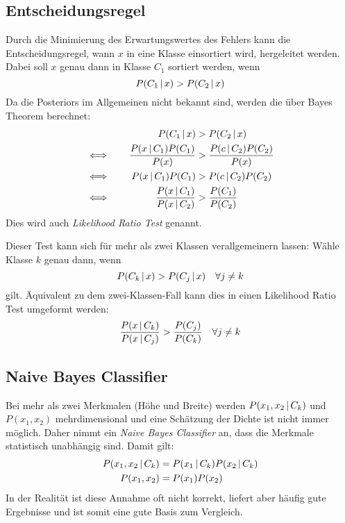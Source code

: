 		\subsection{Entscheidungsregel}
			Durch die Minimierung des Erwartungswertes des Fehlers kann die Entscheidungsregel, wann \(x\) in eine Klasse einsortiert wird, hergeleitet werden. Dabei soll \(x\) genau dann in Klasse \(C_1\) sortiert werden, wenn
			\begin{equation*}
				P(C_1 \,\vert\, x) > P(C_2 \,\vert\, x)
			\end{equation*}
			Da die Posteriors im Allgemeinen nicht bekannt sind, werden die über Bayes Theorem berechnet:
			\begin{align*}
				               &  & P(C_1 \,\vert\, x)                         & > P(C_2 \,\vert\, x)                     & \\
				\quad\iff\quad &  & \frac{P(x \,\vert\, C_1) P(C_1)}{P(x)}     & > \frac{P(c \,\vert\, C_2) P(C_2)}{P(x)} & \\
				\quad\iff\quad &  & P(x \,\vert\, C_1) P(C_1)                  & > P(c \,\vert\, C_2) P(C_2)              & \\
				\quad\iff\quad &  & \frac{P(x \,\vert\, C_1)}{P(x \,\vert\, C_2)} & > \frac{P(C_1)}{P(C_2)}               &
			\end{align*}
			Dies wird auch \emph{Likelihood Ratio Test} genannt.

			Dieser Test kann sich für mehr als zwei Klassen verallgemeinern lassen: Wähle Klasse \( k \) genau dann, wenn
			\begin{equation*}
				P(C_k \,\vert\, x) > P(C_j \,\vert\, x) \quad\forall j \neq k
			\end{equation*}
			gilt. Äquivalent zu dem zwei-Klassen-Fall kann dies in einen Likelihood Ratio Test umgeformt werden:
			\begin{equation*}
				\frac{P(x \,\vert\, C_k)}{P(x \,\vert\, C_j)} > \frac{P(C_j)}{P(C_k)} \quad\forall j \neq k
			\end{equation*}

		\subsection{Naive Bayes Classifier}
			Bei mehr als zwei Merkmalen (\zB Höhe und Breite) werden \( P(x_1, x_2 \,\vert\, C_k) \) und \( P(x_1, x_2) \) mehrdimensional und eine Schätzung der Dichte ist nicht immer möglich. Daher nimmt ein \emph{Naive Bayes Classifier} an, dass die Merkmale statistisch unabhängig sind. Damit gilt:
			\begin{align*}
				P(x_1, x_2 \,\vert\, C_k) & = P(x_1 \,\vert\, C_k) P(x_2 \,\vert\, C_k) \\
				P(x_1, x_2)            & = P(x_1) P(x_2)
			\end{align*}
			In der Realität ist diese Annahme oft nicht korrekt, liefert aber häufig gute Ergebnisse und ist somit eine gute Basis zum Vergleich.

